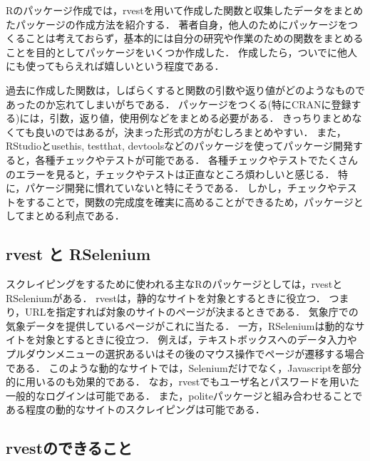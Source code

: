 \documentclass[
]{article}
\begin{document}
Rのパッケージ作成では，rvestを用いて作成した関数と収集したデータをまとめたパッケージの作成方法を紹介する．
著者自身，他人のためにパッケージをつくることは考えておらず，基本的には自分の研究や作業のための関数をまとめることを目的としてパッケージをいくつか作成した．
作成したら，ついでに他人にも使ってもらえれば嬉しいという程度である．

過去に作成した関数は，しばらくすると関数の引数や返り値がどのようなものであったのか忘れてしまいがちである．
パッケージをつくる(特にCRANに登録する)には，引数，返り値，使用例などをまとめる必要がある．
きっちりまとめなくても良いのではあるが，決まった形式の方がむしろまとめやすい．
また，RStudioとusethis, testthat, devtoolsなどのパッケージを使ってパッケージ開発すると，各種チェックやテストが可能である．
各種チェックやテストでたくさんのエラーを見ると，チェックやテストは正直なところ煩わしいと感じる．
特に，パケージ開発に慣れていないと特にそうである．
しかし，チェックやテストをすることで，関数の完成度を確実に高めることができるため，パッケージとしてまとめる利点である．

\hypertarget{rvest-ux3068-rselenium}{%
\subsection{rvest と RSelenium}\label{rvest-ux3068-rselenium}}

スクレイピングをするために使われる主なRのパッケージとしては，rvestとRSeleniumがある．
rvestは，静的なサイトを対象とするときに役立つ．
つまり，URLを指定すれば対象のサイトのページが決まるときである．
気象庁での気象データを提供しているページがこれに当たる．
一方，RSeleniumは動的なサイトを対象とするときに役立つ．
例えば，テキストボックスへのデータ入力やプルダウンメニューの選択あるいはその後のマウス操作でページが遷移する場合である．
このような動的なサイトでは，Seleniumだけでなく，Javascriptを部分的に用いるのも効果的である．
なお，rvestでもユーザ名とパスワードを用いた一般的なログインは可能である．
また，politeパッケージと組み合わせることである程度の動的なサイトのスクレイピングは可能である．

\hypertarget{rvestux306eux3067ux304dux308bux3053ux3068}{%
\subsection{rvestのできること}\label{rvestux306eux3067ux304dux308bux3053ux3068}}
\end{document}
